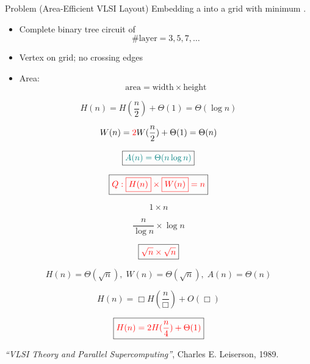 \begin{frame}{}
  \begin{exampleblock}{Problem (Area-Efficient VLSI Layout)}
    Embedding a  into a grid with minimum . \\[2pt]
    \begin{itemize}
      \item Complete binary tree circuit of 
	\[
	  \#\text{layer} = 3,5,7,\ldots
	\]
      \item Vertex on grid; no crossing edges
      \item Area:
	\[
	  \text{area} = \text{width} \times \text{height}
	\]
    \end{itemize}
  \end{exampleblock}

  \pause
\end{frame}

\begin{frame}{}

  \pause
  \[ 
    H(n) = H(\frac{n}{2}) + \Theta(1) = \Theta(\log n) 
  \]

  \pause
  \[ 
    W(n) = \textcolor{red}{2}W(\frac{n}{2}) + \Theta(1) = \Theta(n) 
  \]

  \pause
  \[ 
    \boxed{\textcolor{teal}{A(n) = \Theta(n \log n)}}
  \]
\end{frame}

\begin{frame}{}
  \[ 
    \boxed{\textcolor{red}{Q: \boxed{H(n)} \times \boxed{W(n)} = n}}
  \]
  
  \pause
  \[
    1 \times n
  \]

  \pause
  \[
    \frac{n}{\log n} \times \log n
  \]

  \pause
  \[
    \boxed{\textcolor{red}{\sqrt{n} \times \sqrt{n}}}
  \]

  \pause
  \[
    H(n) = \Theta(\sqrt{n}),\; W(n) = \Theta(\sqrt{n}),\; A(n) = \Theta(n)
  \]

  \pause
  \[
    H(n) = \Box H(\frac{n}{\Box}) + O(\Box) 
  \]

  \pause
  \[ 
    \boxed{\textcolor{red}{H(n) = 2H(\frac{n}{4}) + \Theta(1)}}
  \]
\end{frame}

\begin{frame}{}

  \pause
  \centerline{}
\end{frame}

\begin{frame}{}

  \begin{center}
    {\it ``VLSI Theory and Parallel Supercomputing''}, Charles E. Leiserson, 1989.
  \end{center}
\end{frame}
